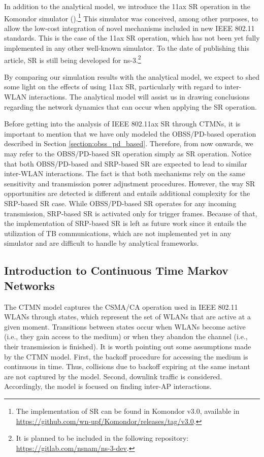 \documentclass[preprint,12pt]{elsarticle}
\begin{document}
	In addition to the analytical model, we introduce the 11ax SR operation in the Komondor simulator (\citealp{barrachina2019komondor}).\footnote{The implementation of SR can be found in Komondor v3.0, available in \url{https://github.com/wn-upf/Komondor/releases/tag/v3.0}.} This simulator was conceived, among other purposes, to allow the low-cost integration of novel mechanisms included in new IEEE 802.11 standards. This is the case of the 11ax SR operation, which has not been yet fully implemented in any other well-known simulator. To the date of publishing this article, SR is still being developed for ns-3.\footnote{It is planned to be included in the following repository: \url{https://gitlab.com/nsnam/ns-3-dev}.} 
	
	By comparing our simulation results with the analytical model, we expect to shed some light on the effects of using 11ax SR, particularly with regard to inter-WLAN interactions. The analytical model will assist us in drawing conclusions regarding the network dynamics that can occur when applying the SR operation.
	
	Before getting into the analysis of IEEE 802.11ax SR through CTMNs, it is important to mention that we have only modeled the OBSS/PD-based operation described in Section \ref{section:obss_pd_based}. Therefore, from now onwards, we may refer to the OBSS/PD-based SR operation simply as SR operation. Notice that both OBSS/PD-based and SRP-based SR are expected to lead to similar inter-WLAN interactions. The fact is that both mechanisms rely on the same sensitivity and transmission power adjustment procedures. However, the way SR opportunities are detected is different and entails additional complexity for the SRP-based SR case. While OBSS/PD-based SR operates for any incoming transmission, SRP-based SR is activated only for trigger frames. Because of that, the implementation of SRP-based SR is left as future work since it entails the utilization of TB communications, which are not implemented yet in any simulator and are difficult to handle by analytical frameworks. 
	
	\subsection{Introduction to Continuous Time Markov Networks}
	
	The CTMN model captures the CSMA/CA operation used in IEEE 802.11 WLANs through states, which represent the set of WLANs that are active at a given moment. Transitions between states occur when WLANs become active (i.e., they gain access to the medium) or when they abandon the channel (i.e., their transmission is finished). It is worth pointing out some assumptions made by the CTMN model. First, the backoff procedure for accessing the medium is continuous in time. Thus, collisions due to backoff expiring at the same instant are not captured by the model. Second, downlink traffic is considered. Accordingly, the model is focused on finding inter-AP interactions.
	
\end{document}
